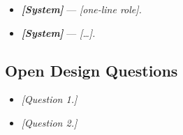 
\begin{itemize}
    \item \textbf{\textit{[System]}} --- \textit{[one-line role].}
    \item \textbf{\textit{[System]}} --- \textit{[\ldots].}
\end{itemize}

\subsection{Open Design Questions}


\begin{itemize}
    \item \textit{[Question 1.]}
    \item \textit{[Question 2.]}
\end{itemize}

\newpage
